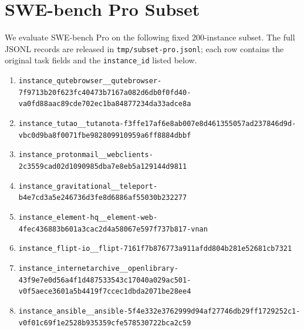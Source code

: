 \section{SWE-bench Pro Subset}
\label{app:swebench-pro-subset}

We evaluate SWE-bench Pro on the following fixed 200-instance subset. The full JSONL records are released in \texttt{tmp/subset-pro.jsonl}; each row contains the original task fields and the \texttt{instance\_id} listed below.

\begingroup
\scriptsize
\raggedright
\sloppy
\setlength{\emergencystretch}{3em}
\setlength{\leftmargini}{1.8em}
\begin{enumerate}
\setlength{\itemsep}{0.15em}
\setlength{\parsep}{0pt}
\item \texttt{instance\_\allowbreak{}qutebrowser\_\allowbreak{}\_\allowbreak{}qutebrowser-\allowbreak{}7f9713b20f623f\allowbreak{}c40473b7167a08\allowbreak{}2d6db0f0fd40-\allowbreak{}va0fd88aac89cd\allowbreak{}e702ec1ba84877\allowbreak{}234da33adce8a}
\item \texttt{instance\_\allowbreak{}tutao\_\allowbreak{}\_\allowbreak{}tutanota-\allowbreak{}f3ffe17af6e8ab\allowbreak{}007e8d46135505\allowbreak{}7ad237846d9d-\allowbreak{}vbc0d9ba8f0071\allowbreak{}fbe98280991095\allowbreak{}9a6ff8884dbbf}
\item \texttt{instance\_\allowbreak{}protonmail\_\allowbreak{}\_\allowbreak{}webclients-\allowbreak{}2c3559cad02d10\allowbreak{}90985dba7e8eb5\allowbreak{}a129144d9811}
\item \texttt{instance\_\allowbreak{}gravitational\_\allowbreak{}\_\allowbreak{}teleport-\allowbreak{}b4e7cd3a5e2467\allowbreak{}36d3fe8d6886af\allowbreak{}55030b232277}
\item \texttt{instance\_\allowbreak{}element-\allowbreak{}hq\_\allowbreak{}\_\allowbreak{}element-\allowbreak{}web-\allowbreak{}4fec436883b601\allowbreak{}a3cac2d4a58067\allowbreak{}e597f737b817-\allowbreak{}vnan}
\item \texttt{instance\_\allowbreak{}flipt-\allowbreak{}io\_\allowbreak{}\_\allowbreak{}flipt-\allowbreak{}7161f7b876773a\allowbreak{}911afdd804b281\allowbreak{}e52681cb7321}
\item \texttt{instance\_\allowbreak{}internetarchiv\allowbreak{}e\_\allowbreak{}\_\allowbreak{}openlibrary-\allowbreak{}43f9e7e0d56a4f\allowbreak{}1d487533543c17\allowbreak{}040a029ac501-\allowbreak{}v0f5aece3601a5\allowbreak{}b4419f7ccec1db\allowbreak{}da2071be28ee4}
\item \texttt{instance\_\allowbreak{}ansible\_\allowbreak{}\_\allowbreak{}ansible-\allowbreak{}5f4e332e376299\allowbreak{}9d94af27746db2\allowbreak{}9ff1729252c1-\allowbreak{}v0f01c69f1e252\allowbreak{}8b935359cfe578\allowbreak{}530722bca2c59}

\end{enumerate}
